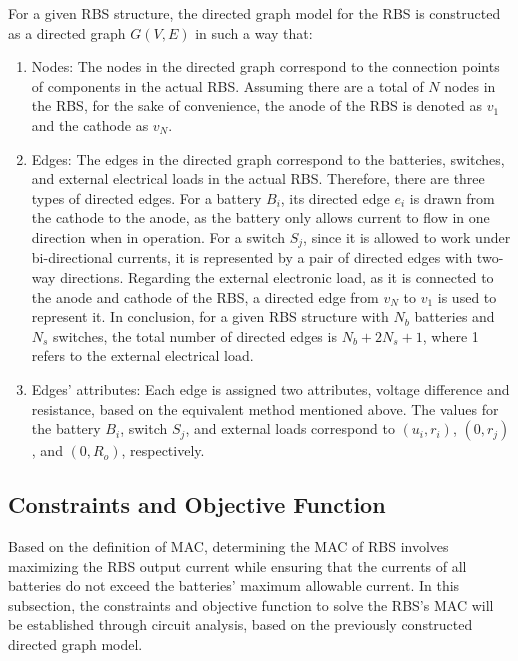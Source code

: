 \documentclass{article}
\begin{document}
For a given RBS structure, the directed graph model for the RBS is constructed as a directed graph $G(V,E)$ in such a way that:
\begin{enumerate}
    \item Nodes:
        The nodes in the directed graph correspond to the connection points of components in the actual RBS. 
        Assuming there are a total of $N$ nodes in the RBS, for the sake of convenience, the anode of the RBS is denoted as $v_1$ and the cathode as $v_N$.
    \item Edges:
        The edges in the directed graph correspond to the batteries, switches, and external electrical loads in the actual RBS.
        Therefore, there are three types of directed edges. 
        For a battery $B_i$, its directed edge $e_i$ is drawn from the cathode to the anode, as the battery only allows current to flow in one direction when in operation.
        For a switch $S_j$, since it is allowed to work under bi-directional currents, it is represented by a pair of directed edges with two-way directions. 
        Regarding the external electronic load, as it is connected to the anode and cathode of the RBS, a directed edge from $v_N$ to $v_1$ is used to represent it. 
        In conclusion, for a given RBS structure with $N_b$ batteries and $N_s$ switches, the total number of directed edges is $N_b+2N_s+1$, where 1 refers to the external electrical load.
    \item Edges' attributes:
        Each edge is assigned two attributes, voltage difference and resistance, based on the equivalent method mentioned above.
        The values for the battery $B_i$, switch $S_j$, and external loads correspond to $(u_i, r_i)$, $(0, r_j)$, and $(0, R_o)$, respectively.
\end{enumerate}

\subsection{Constraints and Objective Function}

Based on the definition of MAC, determining the MAC of RBS involves maximizing the RBS output current while ensuring that the currents of all batteries do not exceed the batteries' maximum allowable current. 
In this subsection, the constraints and objective function to solve the RBS's MAC will be established through circuit analysis, based on the previously constructed directed graph model.
\end{document}
